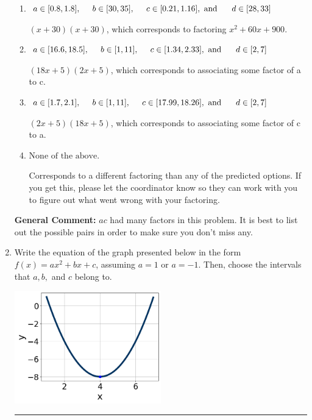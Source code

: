 \documentclass{extbook}[14pt]
\newcommand{\litem}[1]{\item #1

\rule{\textwidth}{0.4pt}}
\begin{document}
\begin{enumerate}
{\begin{enumerate}[label=\Alph*.]
* $(6x + 5)(6x + 5)$, which is the correct option.
\item \( a \in [0.8, 1.8], \hspace*{5mm} b \in [30, 35], \hspace*{5mm} c \in [0.21, 1.16], \text{ and } \hspace*{5mm} d \in [28, 33] \)

 $(x + 30)(x + 30)$, which corresponds to factoring $x^{2} +60 x + 900$.
\item \( a \in [16.6, 18.5], \hspace*{5mm} b \in [1, 11], \hspace*{5mm} c \in [1.34, 2.33], \text{ and } \hspace*{5mm} d \in [2, 7] \)

 $(18x + 5)(2x + 5)$, which corresponds to associating some factor of a to c.
\item \( a \in [1.7, 2.1], \hspace*{5mm} b \in [1, 11], \hspace*{5mm} c \in [17.99, 18.26], \text{ and } \hspace*{5mm} d \in [2, 7] \)

 $(2x + 5)(18x + 5)$, which corresponds to associating some factor of c to a.
\item \( \text{None of the above.} \)

 Corresponds to a different factoring than any of the predicted options. If you get this, please let the coordinator know so they can work with you to figure out what went wrong with your factoring.
\end{enumerate}

\textbf{General Comment:} $ac$ had many factors in this problem. It is best to list out the possible pairs in order to make sure you don't miss any.
}
\litem{
Write the equation of the graph presented below in the form $f(x)=ax^2+bx+c$, assuming  $a=1$ or $a=-1$. Then, choose the intervals that $a, b,$ and $c$ belong to.

\begin{center}
    \includegraphics[width=0.5\textwidth]{../Figures/quadraticGraphToEquationCopyA.png}
\end{center}


}
\end{enumerate}
\end{document}
